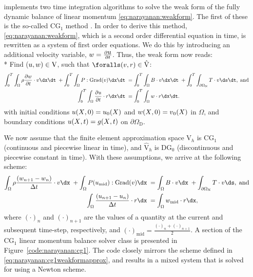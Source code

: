 \twist{} implements two time integration algorithms to solve the weak
form of the fully dynamic balance of linear momentum
\eqref{eq:narayanan:weakform}. The first of these is the
so-called CG$_{1}$ method \citep{ErikssonEstepHansboEtAl1996}. In order
to derive this method, \eqref{eq:narayanan:weakform}, which is
a second order differential equation in time, is rewritten as a system
of first order equations. We do this by introducing an additional
velocity variable, $\mbox{$ w$} = \frac{\partial \mbox{$ u$}}{\partial t}$. Thus, the
weak form now reads: \\*
Find ($\mbox{$ u$}, \mbox{$ w$}) \in \mathrm{V}$, such that $\foralls (\bv,
\br) \in \hat{\mathrm{V}}$:
\begin{equation}
\begin{split}
  \int_{0}^{T} \int_{\Omega} \rho \frac{\partial \bw}{\partial t}
\cdot \bv \dx \dt\; + \int_{0}^{T} \int_{\Omega}
\bP:\mathrm{Grad}(\bv) \dx \dt\; &= \int_{0}^{T} \int_{\Omega} \bB
\cdot \bv \dx \dt\; + \int_{0}^{T} \int_{\partial\Omega_{\mathrm{N}}}
\bT \cdot \bv \ds \dt, \; \mathrm{and}\\ \int_{0}^{T} \int_{\Omega}
\frac{\partial \bu}{\partial t} \cdot \br \dx \dt\; &= \int_{0}^{T}
\int_{\Omega} \bw \cdot \br \dx \dt.
\end{split}
\label{eq:narayanan:cg1weakform}
\end{equation}
with initial conditions $\mbox{$ u$}(\mbox{$ X$}, 0) = \mbox{$ u$}_{0}(\mbox{$ X$})$ and $w(\mbox{$ X$}, 0)
= \mbox{$ v$}_{0}(\mbox{$ X$})$ in $\Omega$, and boundary conditions $\mbox{$ u$}(\mbox{$ X$}, t) =
\mbox{$ g$}(\mbox{$ X$}, t)$ on $\partial\Omega_{\mathrm{D}}$.

We now assume that the finite element approximation space
$\mathrm{V}_{h}$ is CG$_{1}$ (continuous and piecewise linear in time),
and $\hat{\mathrm{V}}_{h}$ is DG$_{0}$ (discontinuous and piecewise
constant in time). With these assumptions, we arrive at the following
scheme:
\begin{equation}
\begin{split}
  \int_{\Omega} \rho \frac{\left(\bw_{n+1} - \bw_{n}\right)}{\Delta t} \cdot \bv \dx\;
  + \int_{\Omega} \bP(\bu_{\mathrm{mid}}):\mathrm{Grad}(\bv) \dx\;
  &=  \int_{\Omega} \bB \cdot \bv \dx\;
  +  \int_{\partial\Omega_{\mathrm{N}}} \bT \cdot \bv \ds,
  \; \mathrm{and}\\
    \int_{\Omega} \frac{\left(\bu_{n+1} - \bu_{n}\right)}{\Delta t} \cdot \br \dx\;
  &=  \int_{\Omega} \bw_{\mathrm{mid}} \cdot \br \dx,
\end{split}
\label{eq:narayanan:cg1weakformapprox}
\end{equation}
where $(\cdot)_{n}$ and $(\cdot)_{n+1}$ are the values of a
quantity at the current and subsequent time-step, respectively, and
$(\cdot)_{\mathrm{mid}} = \frac{(\cdot)_{n} +
  (\cdot)_{n+1}}{2}$.  A section of the CG$_{1}$ linear momentum balance
solver class is presented in Figure~\ref{code:narayanan:cg1}. The
code closely mirrors the scheme defined in
\eqref{eq:narayanan:cg1weakformapprox}, and results in a mixed system
that is solved for using a Newton scheme.

